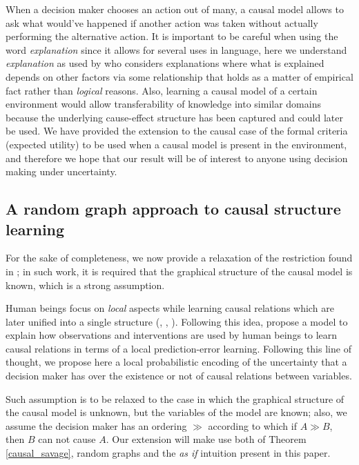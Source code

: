 \documentclass{svjour3}                     %
\begin{document}
When a decision maker chooses an action out of many, a causal model allows to ask what would've happened if another action was taken without actually performing the alternative action. It is important to be careful when using the word \textit{explanation} since it allows for several uses in language, here we understand \textit{explanation} as used by \cite{woodward2005making} who considers explanations where what is explained depends on other factors via some relationship that holds as a matter of empirical fact rather than \textit{logical} reasons. Also, learning a causal model of a certain environment would allow transferability of knowledge into similar domains because the underlying cause-effect structure has been captured and could later be used. We have provided the extension to the causal case of the formal criteria (expected utility) to be used when a causal model is present in the environment, and therefore we hope that our result will be of interest to anyone using decision making under uncertainty. 

\subsection{A random graph approach to causal structure learning}
\label{random_graphs}

For the sake of completeness, we now provide a relaxation of the restriction found in \cite{gonzalez2018playing}; in such work, it is required that the graphical structure of the causal model is known, which is a strong assumption. 

Human beings focus on \textit{local} aspects while learning causal relations which are later unified into a single structure (\cite{fernbach2009causal}, \cite{waldmann2008causal},  \cite{danks2014unifying}). Following this idea, \cite{wellen2012learning} propose a model to explain how observations  and interventions are used by human beings to learn causal relations in terms of a local prediction-error learning. Following this line of thought, we propose here a local probabilistic encoding of the uncertainty that a decision maker has over the existence or not of causal relations between variables.

Such assumption is to be relaxed to the case in which the graphical structure of the causal model is unknown, but the variables of the model are known; also, we assume the decision maker has an ordering $\gg$ according to which if $A \gg B$, then $B$ can not cause $A$. Our extension will make use both of Theorem \ref{causal_savage}, random graphs and the \textit{as if} intuition present in this paper.
\end{document}
